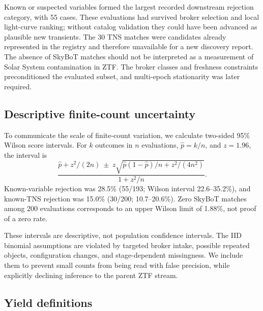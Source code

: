 \documentclass[11pt]{article}
\begin{document}
Known or suspected variables formed the largest recorded downstream rejection category, with 55 cases. These evaluations had survived broker selection and local light-curve ranking; without catalog validation they could have been advanced as plausible new transients. The 30 TNS matches were candidates already represented in the registry and therefore unavailable for a new discovery report. The absence of SkyBoT matches should not be interpreted as a measurement of Solar System contamination in ZTF. The broker classes and freshness constraints preconditioned the evaluated subset, and multi-epoch stationarity was later required.

\subsection{Descriptive finite-count uncertainty}

To communicate the scale of finite-count variation, we calculate two-sided 95\% Wilson score intervals. For $k$ outcomes in $n$ evaluations, $\hat p=k/n$, and $z=1.96$, the interval is
\begin{equation}
\frac{\hat p+z^2/(2n)\ \pm\ z\sqrt{\hat p(1-\hat p)/n+z^2/(4n^2)}}{1+z^2/n}.
\label{eq:wilson}
\end{equation}
Known-variable rejection was 28.5\% (55/193; Wilson interval 22.6--35.2\%), and known-TNS rejection was 15.0\% (30/200; 10.7--20.6\%). Zero SkyBoT matches among 200 evaluations corresponds to an upper Wilson limit of 1.88\%, not proof of a zero rate.

These intervals are descriptive, not population confidence intervals. The IID binomial assumptions are violated by targeted broker intake, possible repeated objects, configuration changes, and stage-dependent missingness. We include them to prevent small counts from being read with false precision, while explicitly declining inference to the parent ZTF stream.

\subsection{Yield definitions}
\end{document}
